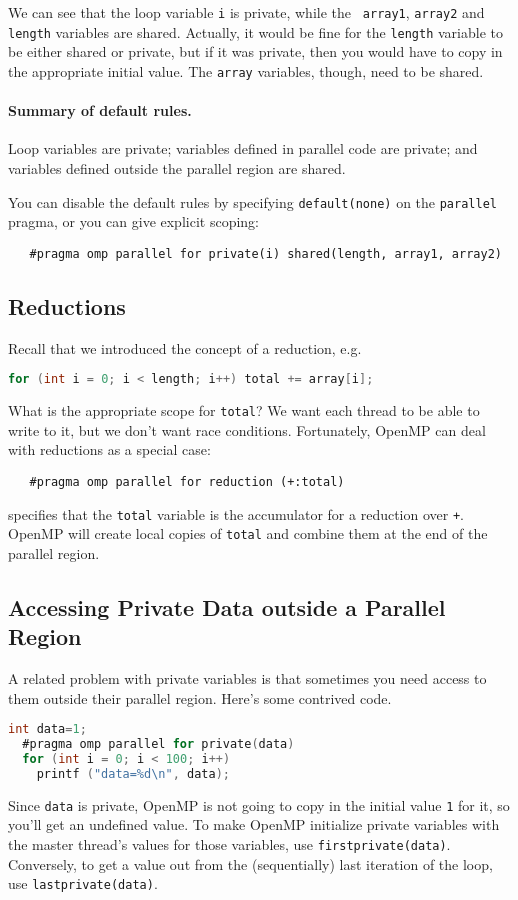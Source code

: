 \documentclass[11pt]{article}
\begin{document}
We can see that the loop variable {\tt i} is private, while the {\tt
  array1}, {\tt array2} and {\tt length} variables are shared.
Actually, it would be fine for the {\tt length} variable to be either
shared or private, but if it was private, then you would have to copy
in the appropriate initial value. The {\tt array} variables, though, 
need to be shared.

\paragraph{Summary of default rules.} Loop variables are private; 
variables defined in parallel code are private; and variables defined
outside the parallel region are shared.

You can disable the default rules by specifying {\tt default(none)}
on the {\tt parallel} pragma, or you can give explicit scoping:

\verb+   #pragma omp parallel for private(i) shared(length, array1, array2)+

\subsection*{Reductions}
Recall that we introduced the concept of a reduction, e.g.
{\small
\begin{lstlisting}[language=C]
  for (int i = 0; i < length; i++) total += array[i];
\end{lstlisting}
}
What is the appropriate scope for {\tt total}? We want each thread
to be able to write to it, but we don't want race conditions.
Fortunately, OpenMP can deal with reductions as a special case:

\verb!   #pragma omp parallel for reduction (+:total)!

\noindent
specifies that the {\tt total} variable is the accumulator for a
reduction over {\tt +}. OpenMP will create local copies of {\tt total} and 
combine them at the end of the parallel region.

\subsection*{Accessing Private Data outside a Parallel Region}
A related problem with private variables is that sometimes you need 
access to them outside their parallel region. Here's some contrived code.

{\small
\begin{lstlisting}[language=C]
  int data=1;
  #pragma omp parallel for private(data)
  for (int i = 0; i < 100; i++)
    printf ("data=%d\n", data);
\end{lstlisting}
}
Since {\tt data} is private, OpenMP is not going to copy in the
initial value {\tt 1} for it, so you'll get an undefined value.  To
make OpenMP initialize private variables with the master thread's
values for those variables, use {\tt firstprivate(data)}.  Conversely,
to get a value out from the (sequentially) last iteration of the loop,
use {\tt lastprivate(data)}.
\end{document}
